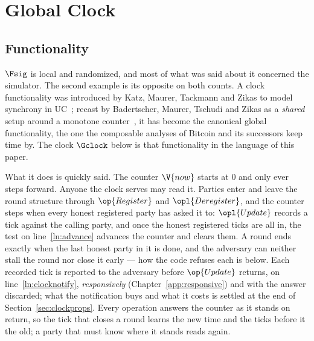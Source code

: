 \documentclass[10pt,oneside,openany]{book}
\theoremstyle{accentdef}
\theoremstyle{accentplain}
\begin{document}
\chapter{Global Clock}\label{sec:gclock}

\section{Functionality}\label{sec:gclockfunc}

$\Fsig$ is local and randomized, and most of what was said about it concerned the simulator. The
second example is its opposite on both counts. A clock functionality was introduced by Katz,
Maurer, Tackmann and Zikas to model synchrony in UC~\cite{KMTZ13}; recast by Badertscher, Maurer,
Tschudi and Zikas as a \emph{shared} setup around a monotone counter~\cite{BMTZ17}, it has become
the canonical global functionality, the one the composable analyses of Bitcoin and its successors
keep time by. The clock $\Gclock$ below is that functionality in the language of this paper.

What it does is quickly said. The counter $\V{now}$ starts at $0$ and only ever steps forward.
Anyone the clock serves may read it. Parties enter and leave the round structure through
$\op{Register}$ and $\opl{Deregister}$, and the counter steps when every honest registered party
has asked it to: $\opl{Update}$ records a tick against the calling party, and once the honest
registered ticks are all in, the test on line~\ref{ln:advance} advances the counter and clears
them. A round ends exactly when the last honest party in it is done, and the adversary can
neither stall the round nor close it early --- how the code refuses each is below. Each recorded
tick is reported to the adversary before $\op{Update}$ returns, on line~\ref{ln:clocknotify},
\emph{responsively} (Chapter~\ref{app:responsive}) and with the answer discarded; what the
notification buys and what it costs is settled at the end of Section~\ref{sec:clockprops}.
Every operation answers the counter as it stands on return, so the tick that closes a round
learns the new time and the ticks before it the old; a party that must know where it stands
reads again.
\end{document}
